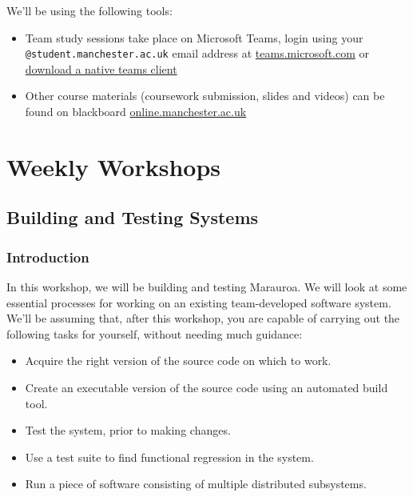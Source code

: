 \documentclass[
]{book}
\providecommand{\tightlist}{%
  \setlength{\itemsep}{0pt}\setlength{\parskip}{0pt}}
\begin{document}
We'll be using the following tools:

\begin{itemize}
\tightlist
\item
  Team study sessions take place on Microsoft Teams, login using your \texttt{@student.manchester.ac.uk} email address at \href{https://teams.microsoft.com/}{teams.microsoft.com} or \href{https://www.microsoft.com/en-gb/microsoft-teams/download-app}{download a native teams client}
\item
  Other course materials (coursework submission, slides and videos) can be found on blackboard \href{https://online.manchester.ac.uk/}{online.manchester.ac.uk}
\end{itemize}



























\hypertarget{part-weekly-workshops}{%
\part{Weekly Workshops}\label{part-weekly-workshops}}

\hypertarget{building}{%
\chapter{Building and Testing Systems}\label{building}}

\hypertarget{Introduction}{%
\section{Introduction}\label{Introduction}}

In this workshop, we will be building and testing Marauroa. We will look at some essential processes for working on an existing team-developed software system. We'll be assuming that, after this workshop, you are capable of carrying out the following tasks for yourself, without needing much guidance:

\begin{itemize}
\tightlist
\item
  Acquire the right version of the source code on which to work.
\item
  Create an executable version of the source code using an automated build tool.
\item
  Test the system, prior to making changes.
\item
  Use a test suite to find functional regression in the system.\\
\item
  Run a piece of software consisting of multiple distributed subsystems.
\end{itemize}
\end{document}
